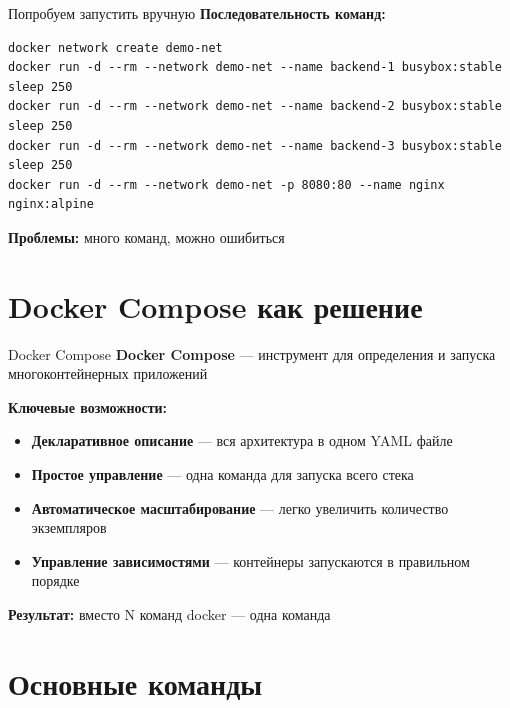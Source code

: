 \documentclass[aspectratio=169]{beamer}
\begin{document}
\begin{frame}[fragile]{Попробуем запустить вручную}
\textbf{Последовательность команд:}

\begin{verbatim}
docker network create demo-net
docker run -d --rm --network demo-net --name backend-1 busybox:stable sleep 250
docker run -d --rm --network demo-net --name backend-2 busybox:stable sleep 250
docker run -d --rm --network demo-net --name backend-3 busybox:stable sleep 250
docker run -d --rm --network demo-net -p 8080:80 --name nginx nginx:alpine
\end{verbatim}

\vspace{0.2cm}

\textbf{Проблемы:} много команд, можно ошибиться
\end{frame}

\section{Docker Compose как решение}

\begin{frame}{Docker Compose}
\textbf{Docker Compose} — инструмент для определения и запуска многоконтейнерных приложений

\vspace{0.2cm}

\textbf{Ключевые возможности:}
\begin{itemize}
\item \textbf{Декларативное описание} — вся архитектура в одном YAML файле
\item \textbf{Простое управление} — одна команда для запуска всего стека
\item \textbf{Автоматическое масштабирование} — легко увеличить количество экземпляров
\item \textbf{Управление зависимостями} — контейнеры запускаются в правильном порядке
\end{itemize}

\vspace{0.2cm}

\textbf{Результат:} вместо N команд docker — одна команда
\end{frame}

\section{Основные команды}
\end{document}
